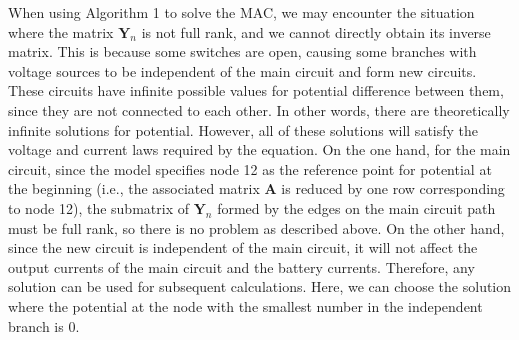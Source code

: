 \documentclass{article}
\begin{document}
When using Algorithm 1 to solve the MAC, we may encounter the situation where the matrix $\bm{Y}_n$ is not full rank, and we cannot directly obtain its inverse matrix. 
This is because some switches are open, causing some branches with voltage sources to be independent of the main circuit and form new circuits. 
These circuits have infinite possible values for potential difference between them, since they are not connected to each other. 
In other words, there are theoretically infinite solutions for potential. 
However, all of these solutions will satisfy the voltage and current laws required by the equation. 
On the one hand, for the main circuit, since the model specifies node 12 as the reference point for potential at the beginning (i.e., the associated matrix $\bm{A}$ is reduced by one row corresponding to node 12), the submatrix of $\bm{Y}_n$ formed by the edges on the main circuit path must be full rank, so there is no problem as described above. 
On the other hand, since the new circuit is independent of the main circuit, it will not affect the output currents of the main circuit and the battery currents. 
Therefore, any solution can be used for subsequent calculations.
Here, we can choose the solution where the potential at the node with the smallest number in the independent branch is 0.
\end{document}
